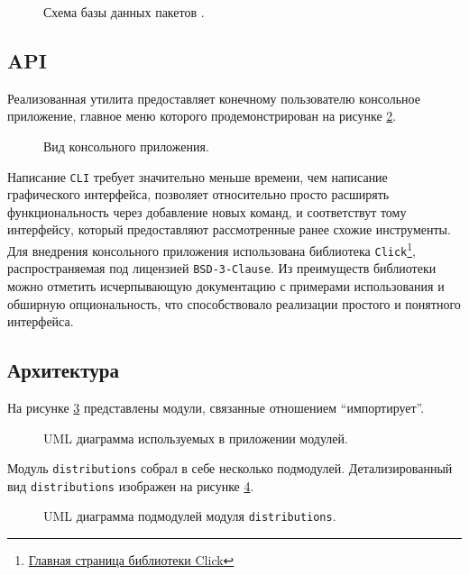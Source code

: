 \begin{figure}
	\centering
	
	\caption{Схема базы данных пакетов {\ubuntu}.}
	\label{bd:schema}
\end{figure}

\subsection{API}
Реализованная утилита предоставляет конечному пользователю консольное приложение, главное меню которого продемонстрирован на рисунке \ref{cli}.

\begin{figure}[ht]
	\centering
	
	\caption{Вид консольного приложения.}
	\label{cli}
\end{figure}

Написание \texttt{CLI} требует значительно меньше времени, чем написание графического интерфейса, позволяет относительно просто расширять функциональность через добавление новых команд, и соответствут тому интерфейсу, который предоставляют рассмотренные ранее схожие инструменты.
Для внедрения консольного приложения использована библиотека \texttt{Click}\footnote{\href{https://click.palletsprojects.com/en/8.1.x/}{Главная страница библиотеки Click}}, распространяемая под лицензией \texttt{BSD-3-Clause}.
Из преимуществ библиотеки можно отметить исчерпывающую документацию с примерами использования и обширную опциональность, что способствовало реализации простого и понятного интерфейса.

\subsection{Архитектура}
На рисунке \ref{uml:packages} представлены модули, связанные отношением \enquote{импортирует}.

\begin{figure}[ht]
	\centering
	
	\caption{UML диаграмма используемых в приложении модулей.}
	\label{uml:packages}
\end{figure}

Модуль \texttt{distributions} собрал в себе несколько подмодулей. Детализированный вид \texttt{distributions} изображен на рисунке \ref{uml:distributions-detailed}.

\begin{figure}[ht]
	\centering
	
	\caption{UML диаграмма подмодулей модуля \texttt{distributions}.}
	\label{uml:distributions-detailed}
\end{figure}

